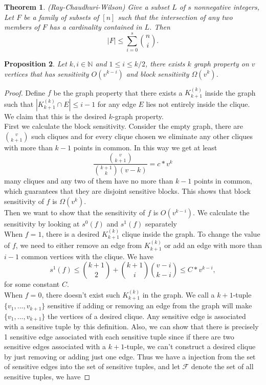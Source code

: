 \documentclass[psamsfonts]{amsart}
\newtheorem{thm}{Theorem}[section]
\newtheorem{prop}[thm]{Proposition}
\theoremstyle{definition}
\theoremstyle{remark}
\numberwithin{equation}{section}
\begin{document}
	\begin{thm}(Ray-Chaudhuri-Wilson)
		Give a subset $L$ of $s$ nonnegative integers, Let $F$ be a family of subsets of $[n]$ such that the intersection of any two members of $F$ has a cardinality contained in $L$. Then 
		\begin{equation}
			|F| \leq \sum_{i=0}^s {n \choose{i}}.
		\end{equation}
	\end{thm}
	
	\begin{prop}
		Let $k,i \in \mathbb{N}$ and $1 \leq i \leq k/2$, there exists $k$ graph property on $v$ vertices that has sensitivity $O(v^{k-i})$ and block sensitivity $\Omega (v^{k})$.
	\end{prop}
	\begin{proof}
		Define $f$ be the graph property that there exists a $K_{k+1}^{(k)}$ inside the graph such that $|K_{k+1}^{(k)} \cap E| \leq  i-1$ for any edge $E$ lies not entirely inside the clique. We claim that this is the desired $k$-graph property.\\
		\indent First we calculate the block sensitivity. Consider the empty graph, there are $v \choose{k+1}$ such cliques and for every clique chosen we eliminate any other cliques with more than $k-1$ points in common. In this way we get at least
		\begin{equation}
			\frac{{v \choose{k+1}}}{{k+1 \choose{k}}(v-k)} = c*v^{k}
		\end{equation}		 
	many cliques and any two of them have no more than $k-1$ points in common, which guarantees that they are disjoint sensitive blocks. This shows that block  sensitivity of $f$ is $\Omega(v^{k})$.\\
		\indent Then we want to show that the sensitivity of $f$ is $O(v^{k-i})$. We calculate the sensitivity by looking at $s^0(f)$ and $s^1(f)$ separately\\
		\indent When $f=1$, there is a desired $K_{k+1}^{(k)}$ clique inside the graph. To change the value of $f$, we need to either remove an edge from $K_{k+1}^{(k)}$ or add an edge with more than $i-1$ common vertices with the clique. We have
		\begin{equation}
			s^1(f) \leq {k+1 \choose{2}}+{k+1 \choose{i}}{v-i \choose{k-i}} \leq C*v^{k-i},
		\end{equation}
		for some constant $C$.\\
		\indent When $f=0$, there doesn't exist such $K_{k+1}^{(k)}$ in the graph. We call a $k+1$-tuple $\{v_1,...,v_{k+1}\}$ sensitive if adding or removing an edge from the graph will make $\{v_1,...,v_{k+1}\}$ the vertices of a desired clique. Any sensitive edge is associated with a sensitive tuple by this definition. Also, we can show that there is precisely 1 sensitive edge associated with each sensitive tuple since if there are two sensitive edges associated with a $k+1$-tuple, we can't construct a desired clique by just removing or adding just one edge. Thus we have a injection from the set of sensitive edges into the set of sensitive tuples, and let $\mathcal{F}$ denote the set of all sensitive tuples, we have

\end{proof}
\end{document}
